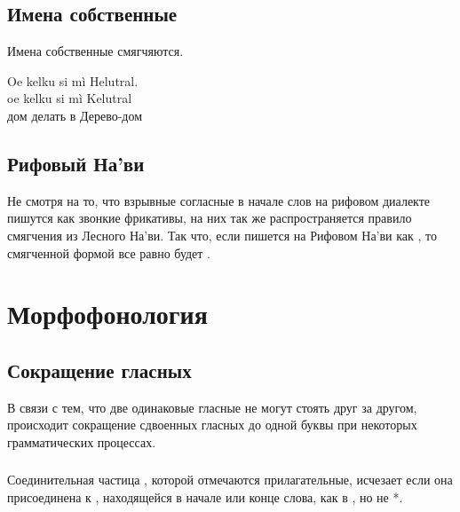 \subsection{Имена собственные} Имена собственные смягчяются.

\begin{interlin} \label{lenition:ex01}
\glll Oe kelku si mì Helutral. \\
      oe kelku si mì Kelutral \\
      дом делать в Дерево-дом \\
\end{interlin}


\subsection{Рифовый На'ви} 
Не смотря на то, что взрывные согласные в начале слов на рифовом диалекте пишутся как звонкие фрикативы, на них так же распространяется правило смягчения из Лесного На'ви. Так что, если   пишется на Рифовом На'ви как , то смягченной формой все равно будет .

\section{Морфофонология}

\subsection{Сокращение гласных} В связи с тем, что две одинаковые гласные не могут стоять друг за другом, происходит сокращение сдвоенных гласных до одной буквы при некоторых грамматических процессах.\label{l-and-s:contract}

\subsubsection{} Соединительная частица , которой отмечаются прилагательные, исчезает если она присоединена к , находящейся в начале или конце слова, как в
, но не *.


